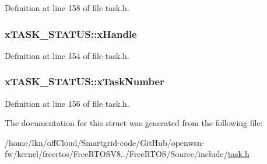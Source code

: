 Definition at line 158 of file task.\+h.

\subsubsection[{\texorpdfstring{x\+Handle}{xHandle}}]{ x\+T\+A\+S\+K\+\_\+\+S\+T\+A\+T\+U\+S\+::x\+Handle}\hypertarget{structx_t_a_s_k___s_t_a_t_u_s_ac57f825f365c3c64bba827285fe3c2a0}{}\label{structx_t_a_s_k___s_t_a_t_u_s_ac57f825f365c3c64bba827285fe3c2a0}


Definition at line 154 of file task.\+h.

\subsubsection[{\texorpdfstring{x\+Task\+Number}{xTaskNumber}}]{ x\+T\+A\+S\+K\+\_\+\+S\+T\+A\+T\+U\+S\+::x\+Task\+Number}\hypertarget{structx_t_a_s_k___s_t_a_t_u_s_acd44468ba37270b04f83d0833c098057}{}\label{structx_t_a_s_k___s_t_a_t_u_s_acd44468ba37270b04f83d0833c098057}


Definition at line 156 of file task.\+h.



The documentation for this struct was generated from the following file\+:\begin{DoxyCompactItemize}
\item 
/home/lkn/off\+Cloud/\+Smartgrid-\/code/\+Git\+Hub/openwsn-\/fw/kernel/freertos/\+Free\+R\+T\+O\+S\+V8../\+Free\+R\+T\+O\+S/\+Source/include/\hyperlink{task_8h}{task.\+h}\end{DoxyCompactItemize}
